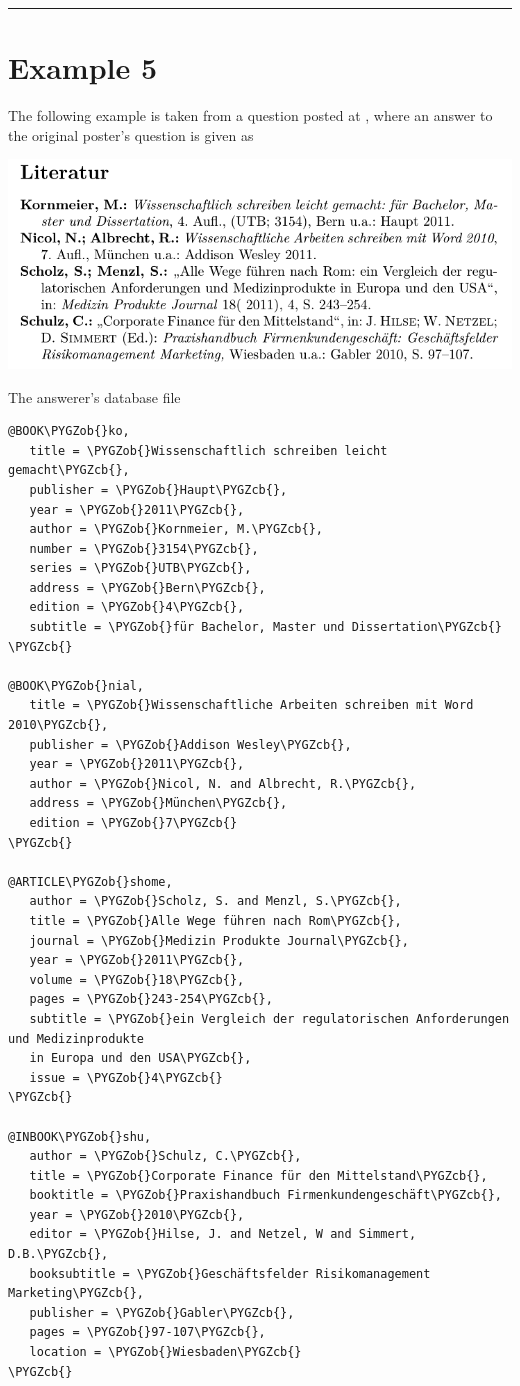 \documentclass[letterpaper,10pt,english]{sphinxmanual}
\def\PYGZob{\char`\{}
\def\PYGZcb{\char`\}}
\begin{document}
\bigskip\hrule{}\bigskip



\section{Example 5}
\label{examples:example-5}
The following example is taken from a question posted at , where an answer to the original poster's question is given as

\includegraphics[width=0.600\linewidth]{example5a.png}

The answerer's database file

\begin{Verbatim}[commandchars=\\\{\}]
@BOOK\PYGZob{}ko,
   title = \PYGZob{}Wissenschaftlich schreiben leicht gemacht\PYGZcb{},
   publisher = \PYGZob{}Haupt\PYGZcb{},
   year = \PYGZob{}2011\PYGZcb{},
   author = \PYGZob{}Kornmeier, M.\PYGZcb{},
   number = \PYGZob{}3154\PYGZcb{},
   series = \PYGZob{}UTB\PYGZcb{},
   address = \PYGZob{}Bern\PYGZcb{},
   edition = \PYGZob{}4\PYGZcb{},
   subtitle = \PYGZob{}für Bachelor, Master und Dissertation\PYGZcb{}
\PYGZcb{}

@BOOK\PYGZob{}nial,
   title = \PYGZob{}Wissenschaftliche Arbeiten schreiben mit Word 2010\PYGZcb{},
   publisher = \PYGZob{}Addison Wesley\PYGZcb{},
   year = \PYGZob{}2011\PYGZcb{},
   author = \PYGZob{}Nicol, N. and Albrecht, R.\PYGZcb{},
   address = \PYGZob{}München\PYGZcb{},
   edition = \PYGZob{}7\PYGZcb{}
\PYGZcb{}

@ARTICLE\PYGZob{}shome,
   author = \PYGZob{}Scholz, S. and Menzl, S.\PYGZcb{},
   title = \PYGZob{}Alle Wege führen nach Rom\PYGZcb{},
   journal = \PYGZob{}Medizin Produkte Journal\PYGZcb{},
   year = \PYGZob{}2011\PYGZcb{},
   volume = \PYGZob{}18\PYGZcb{},
   pages = \PYGZob{}243-254\PYGZcb{},
   subtitle = \PYGZob{}ein Vergleich der regulatorischen Anforderungen und Medizinprodukte
   in Europa und den USA\PYGZcb{},
   issue = \PYGZob{}4\PYGZcb{}
\PYGZcb{}

@INBOOK\PYGZob{}shu,
   author = \PYGZob{}Schulz, C.\PYGZcb{},
   title = \PYGZob{}Corporate Finance für den Mittelstand\PYGZcb{},
   booktitle = \PYGZob{}Praxishandbuch Firmenkundengeschäft\PYGZcb{},
   year = \PYGZob{}2010\PYGZcb{},
   editor = \PYGZob{}Hilse, J. and Netzel, W and Simmert, D.B.\PYGZcb{},
   booksubtitle = \PYGZob{}Geschäftsfelder Risikomanagement Marketing\PYGZcb{},
   publisher = \PYGZob{}Gabler\PYGZcb{},
   pages = \PYGZob{}97-107\PYGZcb{},
   location = \PYGZob{}Wiesbaden\PYGZcb{}
\PYGZcb{}
\end{Verbatim}
\end{document}
